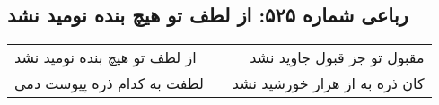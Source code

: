 \begin{center}
\section*{رباعی شماره ۵۲۵: از لطف تو هیچ بنده نومید نشد}
\label{sec:0525}
\begin{longtable}{l p{0.5cm} r}
از لطف تو هیچ بنده نومید نشد
&&
مقبول تو جز قبول جاوید نشد
\\
لطفت به کدام ذره پیوست دمی
&&
کان ذره به از هزار خورشید نشد
\\
\end{longtable}
\end{center}
